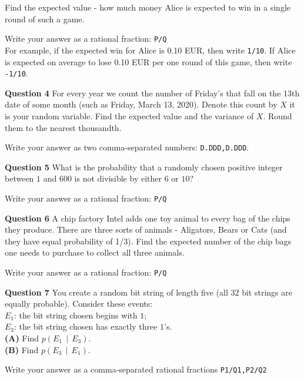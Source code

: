 \documentclass[jou]{apa6}
\begin{document}
Find the expected value - how much money Alice is expected to win in a single round of such a game.

Write your answer as a rational fraction: {\tt P/Q}\\
For example, if the expected win for Alice is 0.10 EUR, then write {\tt 1/10}. If Alice is expected on average to lose 0.10 EUR
per one round of this game, then write {\tt -1/10}. 




\vspace{10pt}
{\bf Question 4} For every year we count the number of Friday's that fall on the 13th date of some month
(such as Friday, March 13, 2020). Denote this count by $X$ \textendash{} it is your random variable.
Find the expected value and the variance of $X$. Round them to the nearest thousandth. 

Write your answer as two comma-separated numbers: {\tt D.DDD,D.DDD}.

\vspace{10pt}
{\bf Question 5} What is the
probability that a randomly chosen positive integer between $1$ and $600$ is not divisible 
by either $6$ or $10$?

Write your answer as a rational fraction: {\tt P/Q}


\vspace{10pt}
{\bf Question 6} A chip factory Intel adds one toy animal to every bag of the chips they produce.
There are three sorts of animals - Aligators, Bears or Cats (and they have equal probability of 1/3). 
Find the expected number of the chip bags one needs to purchase to collect all three animals. 

Write your answer as a rational fraction: {\tt P/Q}

\vspace{10pt}
{\bf Question 7} You create a random bit string of length five (all $32$ bit strings are equally probable). Consider
these events:\\
$E_1$: the bit string chosen begins with $1$;\\
$E_3$: the bit string chosen has exactly three $1$’s.\\
{\bf (A)} Find $p(E_1 \,\mid\, E_3)$.\\
{\bf (B)} Find $p(E_3 \,\mid\, E_1)$.

Write your answer as a comma-separated rational fractions {\tt P1/Q1,P2/Q2}
\end{document}
